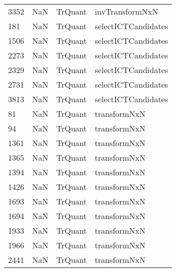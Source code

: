 \begin{tabular}{llll}
3352 &                   NaN &                    TrQuant &                           invTransformNxN \\
181  &                   NaN &                    TrQuant &                       selectICTCandidates \\
1506 &                   NaN &                    TrQuant &                       selectICTCandidates \\
2273 &                   NaN &                    TrQuant &                       selectICTCandidates \\
2329 &                   NaN &                    TrQuant &                       selectICTCandidates \\
2731 &                   NaN &                    TrQuant &                       selectICTCandidates \\
3813 &                   NaN &                    TrQuant &                       selectICTCandidates \\
81   &                   NaN &                    TrQuant &                              transformNxN \\
94   &                   NaN &                    TrQuant &                              transformNxN \\
1361 &                   NaN &                    TrQuant &                              transformNxN \\
1365 &                   NaN &                    TrQuant &                              transformNxN \\
1394 &                   NaN &                    TrQuant &                              transformNxN \\
1426 &                   NaN &                    TrQuant &                              transformNxN \\
1693 &                   NaN &                    TrQuant &                              transformNxN \\
1694 &                   NaN &                    TrQuant &                              transformNxN \\
1933 &                   NaN &                    TrQuant &                              transformNxN \\
1966 &                   NaN &                    TrQuant &                              transformNxN \\
2441 &                   NaN &                    TrQuant &                              transformNxN \\

\end{tabular}
